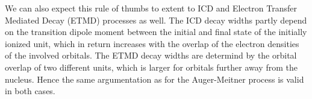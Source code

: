 We can also expect this rule of thumbs to extent to ICD and
Electron Transfer Mediated Decay (ETMD) processes as well. The ICD
decay widths partly depend on the transition dipole moment between the
initial and final state of the initially ionized unit, which in return increases
with the overlap of the electron densities of the involved orbitals.
The ETMD decay widths are determind by the orbital overlap of two different units,
which is larger for orbitals further away from the nucleus.
Hence the same argumentation as for the Auger-Meitner process is valid in both
cases.



